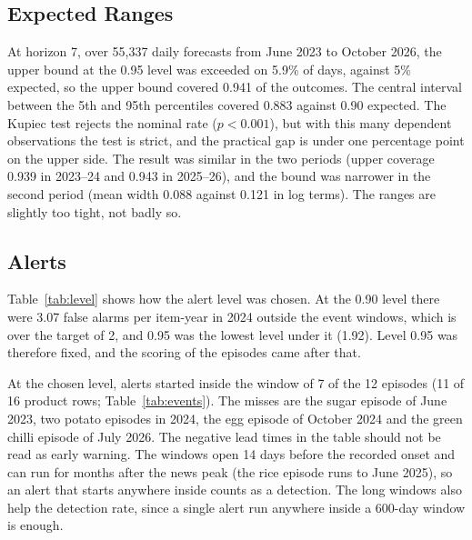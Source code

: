 \subsection{Expected Ranges}
At horizon 7, over 55,337 daily forecasts from June 2023 to October 2026, the upper bound at the 0.95 level was exceeded on 5.9\% of days, against 5\% expected, so the upper bound covered 0.941 of the outcomes. The central interval between the 5th and 95th percentiles covered 0.883 against 0.90 expected. The Kupiec test rejects the nominal rate ($p<0.001$), but with this many dependent observations the test is strict, and the practical gap is under one percentage point on the upper side. The result was similar in the two periods (upper coverage 0.939 in 2023--24 and 0.943 in 2025--26), and the bound was narrower in the second period (mean width 0.088 against 0.121 in log terms). The ranges are slightly too tight, not badly so.

\subsection{Alerts}
Table~\ref{tab:level} shows how the alert level was chosen. At the 0.90 level there were 3.07 false alarms per item-year in 2024 outside the event windows, which is over the target of 2, and 0.95 was the lowest level under it (1.92). Level 0.95 was therefore fixed, and the scoring of the episodes came after that.

\begin{table}[H]\centering\small
\caption[Alert levels and false alarms]{Alert levels. False alarms are alert runs per item-year in 2024 outside event windows; recall and precision are over the whole period, counted by product row.}\label{tab:level}

\par{}
\end{table}

At the chosen level, alerts started inside the window of 7 of the 12 episodes (11 of 16 product rows; Table~\ref{tab:events}). The misses are the sugar episode of June 2023, two potato episodes in 2024, the egg episode of October 2024 and the green chilli episode of July 2026. The negative lead times in the table should not be read as early warning. The windows open 14 days before the recorded onset and can run for months after the news peak (the rice episode runs to June 2025), so an alert that starts anywhere inside counts as a detection. The long windows also help the detection rate, since a single alert run anywhere inside a 600-day window is enough.

